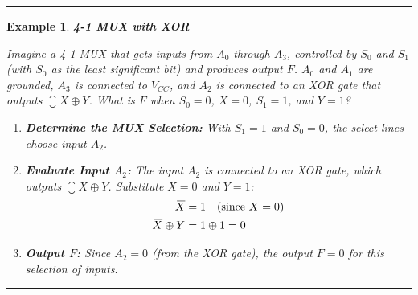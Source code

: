 \documentclass[12pt]{article}
\newtheorem{example}{Example}
\newenvironment{examp}
{\vspace{0.5cm}
 \hrule
\vspace{0.5cm}
\begin{example}}
{\hrule
\vspace{0.5cm}
\end{example}}
\begin{document}
\begin{examp}
	\textbf{4-1 MUX with XOR}

	Imagine a 4-1 MUX that gets inputs from \( A_0 \) through \( A_3 \), controlled by \( S_0 \) and \( S_1 \) (with \( S_0 \) as the least significant bit) and produces output \( F \). \( A_0 \) and \( A_1 \) are grounded, \( A_3 \) is connected to \( V_{CC} \), and \( A_2 \) is connected to an XOR gate that outputs \( \closure{X} \oplus Y \). What is \( F \) when \( S_0 = 0 \), \( X = 0 \), \( S_1 = 1 \), and \( Y = 1 \)?

	\begin{enumerate}
		\item \textbf{Determine the MUX Selection:} With \( S_1 = 1 \) and \( S_0 = 0 \), the select lines choose input \( A_2 \).

		\item \textbf{Evaluate Input \( A_2 \):} The input \( A_2 \) is connected to an XOR gate, which outputs \( \closure{X} \oplus Y \). Substitute \( X = 0 \) and \( Y = 1 \):
		      \begin{align*}
			      {}\mkern3mu\overline{\mkern-3muX}          & = 1 \quad \text{(since \( X = 0 \))} \\
			      {}\mkern3mu\overline{\mkern-3muX} \oplus Y & = 1 \oplus 1 = 0
		      \end{align*}

		\item \textbf{Output \( F \):} Since \( A_2 = 0 \) (from the XOR gate), the output \( F = 0 \) for this selection of inputs.
	\end{enumerate}
\end{examp}
\end{document}
